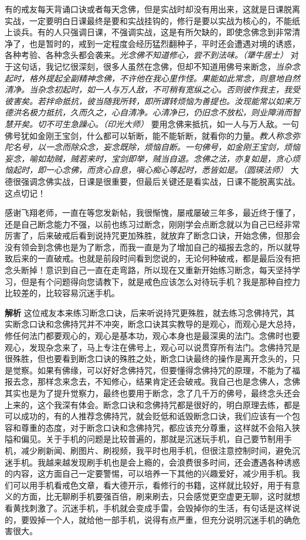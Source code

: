 有的戒友每天背诵口诀或者每天念佛，但是实战时却没有用出来，这就是日课脱离实战，一定要明白日课最终是要和实战挂钩的，修行是要以实战为核心的，不能纸上谈兵。有的人只强调日课，不强调实战，这是有所欠缺的，即使念佛念到非常清净了，也是暂时的，戒到一定程度会经历猛烈翻种子，平时还会遭遇对境的诱惑，各种考验、各种念头都会袭来。\textit{光念佛不知道修心，尝不到法味。（犟牛居士）} 对于这句话，我记忆很深刻，很多人虽然在念佛，但却不知道用佛号来断念，\textit{当杂念起时，格外提起全副精神念佛，不许他在我心里作怪。果能如此常念，则意地自然清净。当杂念初起时，如一人与万人敌，不可稍有宽纵之心。否则彼作我主，我受彼害矣。若拌命抵抗，彼当随我所转，即所谓转烦恼为善提也。汝现能常以如来万德洪名极力抵抗，久而久之，心自清净。心清净已，仍旧念不放松，则业障消而智慧开矣。切不可生急躁心。（印光大师）} 要用念佛来抵抗，如一人与万人敌。一句佛号犹如金刚王宝剑，什么都可以斩断，能不能斩断，就看你的力量。\textit{教人称念弥陀名号，以一念而除众念，妄念既除，烦恼自断。一句佛号，如金刚王宝剑，烦恼妄念，喻如劫贼，贼若来时，宝剑即举，贼当自退。念佛之法，亦复如是，贪心烦恼起时，即一心念佛，而贪心自息，嗔心痴心等起时，悉皆如是。（圆瑛法师）} 大德很强调念佛实战，日课是很重要，但最后关键还是看实战，日课不能脱离实战。这点切记！

\begin{case}[练习过程中的问题]
    感谢飞翔老师，一直在等您发新帖，我很惭愧，屡戒屡破三年多，最近终于懂了，还是自己断念能力不强，以前也练习过断念，刚刚学会点断念就以为自己已经非常厉害了，后来破戒后看到说持咒更加殊胜，就放弃了断念口诀，开始念佛，但那会没有领会到念佛也是为了断念，而我一直是为了增加自己的福报去念的，所以就导致后来的一直破戒。也就是前段时间看到您说的，无论何种破戒，都是最后没有把念头断掉！意识到自己一直在走弯路，所以现在又重新开始练习断念，每天坚持学习，但是有个问题得向您请教下，就是戒色应该怎么对待玩手机？我是那种自控力比较差的，比较容易沉迷手机。

    \textbf{解析} 这位戒友本来练习断念口诀，后来听说持咒更殊胜，就去练习念佛持咒，其实断念口诀和念佛持咒并不冲突，断念口诀其实教导的是观心，而观心是大总持，修任何法门都要观心的，观心是基本功，观心本身也是最深奥的法门。念佛时也要观心，发现杂念来了，马上专注在佛号上，观心可以说贯穿所有法门。念佛持咒是很殊胜，但也要看到断念口诀的殊胜之处，断念口诀最终的操作是离开念头的，只是觉察。如果有佛缘，可以好好念佛持咒，但要懂得念佛持咒的原理，不能为了福报去念，那样念来念去，不知修心，结果肯定还会破戒。我自己也是念佛人，念佛其实也是为了提升觉察力，最终也要用于断念，念了几千万的佛号，最终念头还会上来的，这个我深有体会。断念口诀和念佛持咒都是很好的，明白原理去练，都是可以成功的，有的人推荐念佛持咒，就会贬低和诋毁断念口诀，我们应该有一个包容和尊重的态度，对于断念口诀和念佛持咒，都应该充分尊重，这样就不会陷入狭隘和偏见。关于手机的问题是比较普遍的，那就是沉迷玩手机，自己要节制用手机，减少刷新闻、刷图片、刷视频，我平时也用手机，但很注意控制时间，避免沉迷手机。我越来越发现刷手机也是会上瘾的，会浪费很多时间，还会遭遇各种诱惑的内容，这方面自己一定要警惕，可以培养一下其他的兴趣爱好，减少用手机。我们可以用手机看戒色文章，看大德开示，看修行的书籍，这样就比较好，用于有意义的方面，比无聊刷手机要强百倍，刷来刷去，只会感觉更空虚更无聊，这时就想看黄找刺激了。沉迷手机，手机就会变成手雷，会毁掉你的生活，有句话是这样说的，要毁掉一个人，就给他一部手机，说得有点严重，但充分说明沉迷手机的确危害很大。
\end{case}

